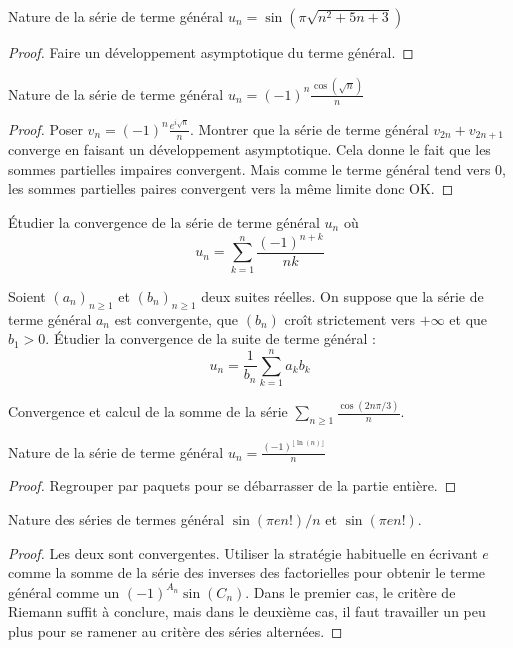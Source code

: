 \documentclass[french,a4paper]{article}
\theoremstyle{plain}
\theoremstyle{definition}
\theoremstyle{remark}
\begin{document}
\begin{ex}{}
	Nature de la série de terme général $u_n=\sin(\pi\sqrt{n^2+5n+3})$
\end{ex}
\begin{proof}
	Faire un développement asymptotique du terme général.
\end{proof}

\begin{ex}{}
	Nature de la série de terme général $u_n=\displaystyle(-1)^n\frac{\cos(\sqrt{n})}{n}$
\end{ex}
\begin{proof}
	Poser $\displaystyle v_n=(-1)^n\frac{e^{i\sqrt{n}}}{n}$. Montrer que la série de terme général $v_{2n}+v_{2n+1}$ converge en faisant un développement asymptotique. Cela donne le fait que les sommes partielles impaires convergent. Mais comme le terme général tend vers $0$, les sommes partielles paires convergent vers la même limite donc OK.
\end{proof}

\begin{ex}{}
	Étudier la convergence de la série de terme général $u_n$ où $$u_n=\sum_{k=1}^{n}\frac{(-1)^{n+k}}{nk}$$
\end{ex}

\begin{ex}{}
	Soient $(a_n)_{n\geqslant 1}$ et $(b_n)_{n\geqslant 1}$ deux suites réelles. On suppose que la série de terme général $a_n$ est convergente, que $(b_n)$ croît strictement vers $+\infty$ et que $b_1>0$. Étudier la convergence de la suite de terme général : $$u_n=\frac{1}{b_n}\sum_{k=1}^{n}a_kb_k$$
\end{ex}

\begin{ex}{}
	Convergence et calcul de la somme de la série $\displaystyle\sum_{n\geqslant 1}\frac{\cos(2n\pi/3)}{n}$.
\end{ex}

\begin{ex}{}
	Nature de la série de terme général $u_n=\displaystyle \frac{(-1)^{\lfloor\ln(n)\rfloor}}{n}$
\end{ex}
\begin{proof}
	Regrouper par paquets pour se débarrasser de la partie entière.
\end{proof}
\begin{ex}{}
	Nature des séries de termes général $\sin(\pi e n!)/n$ et $\sin(\pi en!)$.
\end{ex}
\begin{proof}
	Les deux sont convergentes. Utiliser la stratégie habituelle en écrivant $e$ comme la somme de la série des inverses des factorielles pour obtenir le terme général comme un $(-1)^{A_n}\sin(C_n)$. Dans le premier cas, le critère de Riemann suffit à conclure, mais dans le deuxième cas, il faut travailler un peu plus pour se ramener au critère des séries alternées.
\end{proof}
\end{document}
